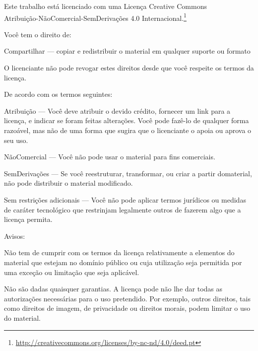 \cleartorecto
\thispagestyle{chapter}
{\copyrightsize\setlength{\parindent}{0pt}%
\raggedright\label{copyright-details}
\setlength{\parskip}{7pt}

{\centering

{\LARGE\ccbyncnd}

Este trabalho está licenciado com uma Licença Creative Commons\\
Atribuição-NãoComercial-SemDerivações 4.0 Internacional.\footnote{%
\href{http://creativecommons.org/licenses/by-nc-nd/4.0/deed.pt}{http://creativecommons.org/licenses/by-nc-nd/4.0/deed.pt}}

}

Você tem o direito de:

\begin{packeditemize}
\item Compartilhar — copiar e redistribuir o material em qualquer suporte ou formato
\end{packeditemize}

O licenciante não pode revogar estes direitos desde que você respeite os termos da licença.

De acordo com os termos seguintes:

\begin{packeditemize}
\item Atribuição — Você deve atribuir o devido crédito, fornecer um link para a licença, e indicar se foram feitas alterações. Você pode fazê-lo de qualquer forma razoável, mas não de uma forma que sugira que o licenciante o apoia ou aprova o seu uso.
\item NãoComercial — Você não pode usar o material para fins comerciais.
\item SemDerivações — Se você reestruturar, transformar, ou criar a partir domaterial, não pode distribuir o material modificado.
\end{packeditemize}

Sem restrições adicionais — Você não pode aplicar termos jurídicos ou medidas de caráter tecnológico que restrinjam legalmente outros de fazerem algo que a licença permita.

Avisos:

Não tem de cumprir com os termos da licença relativamente a elementos do material que estejam no domínio público ou cuja utilização seja permitida por uma exceção ou limitação que seja aplicável.

Não são dadas quaisquer garantias. A licença pode não lhe dar todas as autorizações necessárias para o uso pretendido. Por exemplo, outros direitos, tais como direitos de imagem, de privacidade ou direitos morais, podem limitar o uso do material.

}
